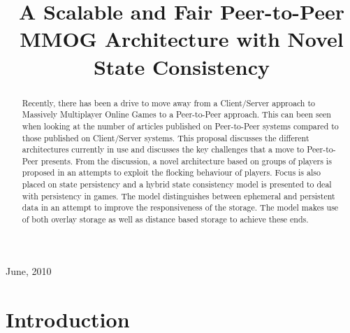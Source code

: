 \documentclass[journal,oneside,a4paper,onecolumn]{IEEEtran}
\begin{document}
%
\title{A Scalable and Fair Peer-to-Peer MMOG Architecture with Novel State Consistency}

\author{
}

\maketitle

\begin{abstract}
Recently, there has been a drive to move away from a Client/Server approach to Massively Multiplayer Online Games to a Peer-to-Peer approach. This can been seen when looking at the number of articles published on Peer-to-Peer systems compared to those published on Client/Server systems. This proposal discusses the different architectures currently in use and discusses the key challenges that a move to Peer-to-Peer presents. From the discussion, a novel architecture based on groups of players is proposed in an attempts to exploit the flocking behaviour of players. Focus is also placed on state persistency and a hybrid state consistency model is presented to deal with persistency in games. The model distinguishes between ephemeral and persistent data in an attempt to improve the responsiveness of the storage. The model makes use of both overlay storage as well as distance based storage to achieve these ends.
\end{abstract}

\hfill June, 2010

\section{Introduction}
\end{document}
